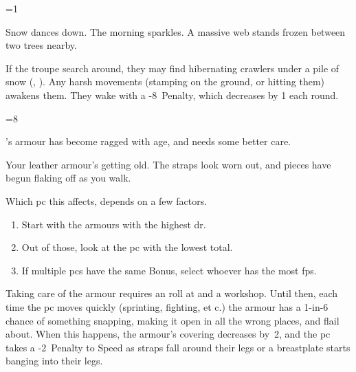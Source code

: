 \ifnum\value{cycle}=1

\begin{boxtext}
  Snow dances down.
  The morning sparkles.
  A massive web stands frozen between two trees nearby.
\end{boxtext}

If the troupe search around, they may find  hibernating \glspl{crawler} under a pile of snow (, \tn[10]).
Any harsh movements (stamping on the ground, or hitting them) awakens them.
They wake with a -8~Penalty, which decreases by 1 each \gls{round}.


\else

\ifnum\value{r12}=8

's armour has become ragged with age, and needs some better care.

\begin{boxtext}
  Your leather armour's getting old.
  The straps look worn out, and pieces have begun flaking off as you walk.
\end{boxtext}

Which \gls{pc} this affects, depends on a few factors.

\begin{enumerate}
  \item
  Start with the \glspl{armour} with the highest \gls{dr}.
  \item
  Out of those, look at the \gls{pc} with the lowest  total.
  \item
  If multiple \glspl{pc} have the same Bonus, select whoever has the most \glspl{fp}.
\end{enumerate}

Taking care of the \gls{armour} requires an  roll at \tn[10] and a workshop.
Until then, each time the \gls{pc} moves quickly (sprinting, fighting, et c.) the armour has a 1-in-6 chance of something snapping, making it open in all the wrong places, and flail about.
When this happens, the \gls{armour}'s \gls{covering} decreases by~2, and the \gls{pc} takes a -2~Penalty to Speed as straps fall around their legs or a breastplate starts banging into their legs.

\fi

\fi
